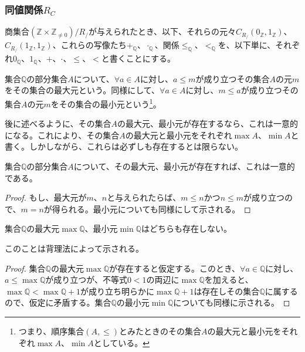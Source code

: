 \documentclass[dvipdfmx]{jsarticle}
\begin{document}
\subsubsection{同値関係$R_{C}$}%
\begin{dfn}
商集合$\left( \mathbb{Z} \times \mathbb{Z}_{\neq 0} \right) /R_{/} $が与えられたとき、以下、それらの元々$C_{R_{/}}\left( 0_{\mathbb{Z}},1_{\mathbb{Z}} \right)$、$C_{R_{/}}\left( 1_{\mathbb{Z}},1_{\mathbb{Z}} \right)$、これらの写像たち$+_{\mathbb{Q}}$、$\cdot_{\mathbb{Q}}$、関係$\leq_{\mathbb{Q}}$、$<_{\mathbb{Q}}$を、以下単に、それぞれ$0_{\mathbb{Q}}$、$1_{\mathbb{Q}}$、$+$、$\cdot$、$\leq$、$<$と書くことにする。
\end{dfn}
\begin{dfn}
集合$\mathbb{Q}$の部分集合$A$について、$\forall a \in A$に対し、$a \leq m$が成り立つその集合$A$の元$m$をその集合の最大元という。同様にして、$\forall a \in A$に対し、$m \leq a$が成り立つその集合$A$の元$m$をその集合の最小元という\footnote{つまり、順序集合$(A, \leq )$とみたときのその集合$A$の最大元と最小元をそれぞれ$\max A$、$\min A$としている。}。
\end{dfn}\par
後に述べるように、その集合$A$の最大元、最小元が存在するなら、これは一意的になる。これにより、その集合$A$の最大元と最小元をそれぞれ$\max A$、$\min A$と書く。しかしながら、これらは必ずしも存在するとは限らない。
\begin{thm}\label{1.2.6.20}
集合$\mathbb{Q}$の部分集合$A$について、その最大元、最小元が存在すれば、これは一意的である。
\end{thm}
\begin{proof}
もし、最大元が$m$、$n$と与えられたらば、$m \leq n$かつ$n \leq m$が成り立つので、$m = n$が得られる。最小元についても同様にして示される。
\end{proof}
\begin{thm}\label{1.2.6.21}
集合$\mathbb{Q}$の最大元$\max\mathbb{Q}$、最小元$\min\mathbb{Q}$はどちらも存在しない。\par
\end{thm}\par
このことは背理法によって示される。
\begin{proof}
集合$\mathbb{Q}$の最大元$\max\mathbb{Q}$が存在すると仮定する。このとき、$\forall a \in \mathbb{Q}$に対し、$a \leq \max\mathbb{Q}$が成り立つが、不等式$0 < 1$の両辺に$\max\mathbb{Q}$を加えると、$\max\mathbb{Q} < \max\mathbb{Q} + 1$が成り立ち明らかに$\max\mathbb{Q} + 1$は存在しその集合$\mathbb{Q}$に属するので、仮定に矛盾する。集合$\mathbb{Q}$の最小元$\min\mathbb{Q}$についても同様に示される。
\end{proof}
\end{document}

